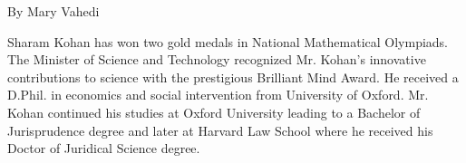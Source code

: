 \documentclass[12pt]{article}
\begin{document}
By Mary Vahedi

Sharam Kohan has won two gold medals in National Mathematical Olympiads. The Minister of Science and Technology recognized Mr. Kohan's innovative contributions to science with the prestigious Brilliant Mind Award. He received a D.Phil. in economics and social intervention from University of Oxford. Mr. Kohan continued his studies at Oxford University leading to a Bachelor of Jurisprudence degree and later at Harvard Law School where he received his Doctor of Juridical Science degree. 

\end{document}
